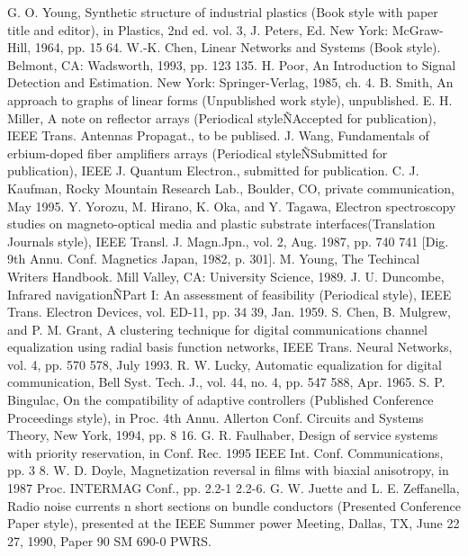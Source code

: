 \documentclass[letterpaper, 10 pt, conference]{ieeeconf}  %
\begin{document}
\begin{thebibliography}{99}

 G. O. Young,  Synthetic structure of industrial plastics (Book style with paper title and editor),  	in Plastics, 2nd ed. vol. 3, J. Peters, Ed.  New York: McGraw-Hill, 1964, pp. 15 64.
 W.-K. Chen, Linear Networks and Systems (Book style).	Belmont, CA: Wadsworth, 1993, pp. 123 135.
 H. Poor, An Introduction to Signal Detection and Estimation.   New York: Springer-Verlag, 1985, ch. 4.
 B. Smith,  An approach to graphs of linear forms (Unpublished work style),  unpublished.
 E. H. Miller,  A note on reflector arrays (Periodical styleÑAccepted for publication),  IEEE Trans. Antennas Propagat., to be publised.
 J. Wang,  Fundamentals of erbium-doped fiber amplifiers arrays (Periodical styleÑSubmitted for publication),  IEEE J. Quantum Electron., submitted for publication.
 C. J. Kaufman, Rocky Mountain Research Lab., Boulder, CO, private communication, May 1995.
 Y. Yorozu, M. Hirano, K. Oka, and Y. Tagawa,  Electron spectroscopy studies on magneto-optical media and plastic substrate interfaces(Translation Journals style),  IEEE Transl. J. Magn.Jpn., vol. 2, Aug. 1987, pp. 740 741 [Dig. 9th Annu. Conf. Magnetics Japan, 1982, p. 301].
 M. Young, The Techincal Writers Handbook.  Mill Valley, CA: University Science, 1989.
 J. U. Duncombe,  Infrared navigationÑPart I: An assessment of feasibility (Periodical style),  IEEE Trans. Electron Devices, vol. ED-11, pp. 34 39, Jan. 1959.
 S. Chen, B. Mulgrew, and P. M. Grant,  A clustering technique for digital communications channel equalization using radial basis function networks,  IEEE Trans. Neural Networks, vol. 4, pp. 570 578, July 1993.
 R. W. Lucky,  Automatic equalization for digital communication,  Bell Syst. Tech. J., vol. 44, no. 4, pp. 547 588, Apr. 1965.
 S. P. Bingulac,  On the compatibility of adaptive controllers (Published Conference Proceedings style),  in Proc. 4th Annu. Allerton Conf. Circuits and Systems Theory, New York, 1994, pp. 8 16.
 G. R. Faulhaber,  Design of service systems with priority reservation,  in Conf. Rec. 1995 IEEE Int. Conf. Communications, pp. 3 8.
 W. D. Doyle,  Magnetization reversal in films with biaxial anisotropy,  in 1987 Proc. INTERMAG Conf., pp. 2.2-1 2.2-6.
 G. W. Juette and L. E. Zeffanella,  Radio noise currents n short sections on bundle conductors (Presented Conference Paper style),  presented at the IEEE Summer power Meeting, Dallas, TX, June 22 27, 1990, Paper 90 SM 690-0 PWRS.

\end{thebibliography}
\end{document}
